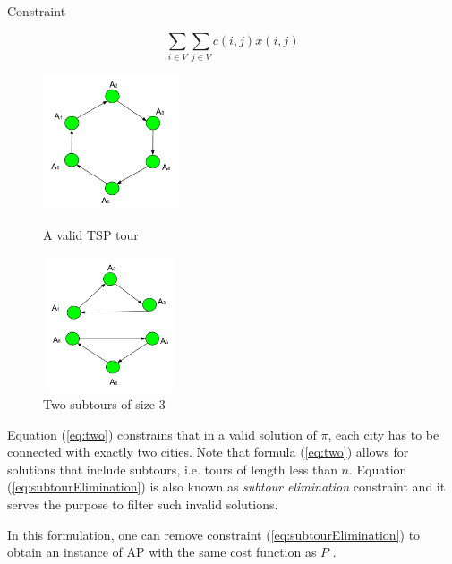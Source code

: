 \documentclass{mprop}
\theoremstyle{definition}
\begin{document}
Constraint 

\begin{equation}
\label{eq:two}
\sum_{i\in V}\sum_{j\in V} c(i,j)x(i,j)
\end{equation}

\begin{figure}
\centering
\begin{minipage}{.5\textwidth}
  \centering
  \includegraphics[width=4cm, height=4cm]{images/valid.png}
  \caption{A valid TSP tour}
  \label{fig:tour}
\end{minipage}%
\begin{minipage}{.5\textwidth}
  \centering
  \includegraphics[width=4cm, height=4cm]{images/invalid.png}
  \caption{Two subtours of size 3}
  \label{fig:subtours}
\end{minipage}
\end{figure}

Equation (\ref{eq:two}) constrains that in a valid solution of $\pi$, each city has to be connected with exactly two cities. Note that formula (\ref{eq:two}) allows for solutions that include subtours, i.e. tours of length less than $n$. Equation (\ref{eq:subtourElimination}) is also known as \textit{subtour elimination} constraint and it serves the purpose to filter such invalid solutions.

In this formulation, one can remove constraint (\ref{eq:subtourElimination}) to obtain an instance of AP with the same cost function as $P$ \citep{Little63,Eastman58,Bellmore71}.
\end{document}
